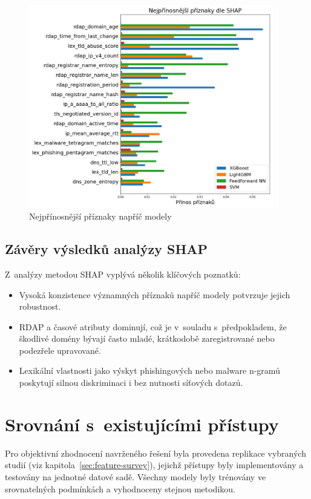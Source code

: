 \begin{figure}[h]
    \centering
    \includegraphics[width=0.95\textwidth]{obrazky-figures/top_10_shap.png}
    \caption{Nejpřínosnější příznaky napříč modely}
    \label{fig:top10shap}
\end{figure}

\subsection*{Závěry výsledků analýzy SHAP}

Z~analýzy metodou SHAP vyplývá několik klíčových poznatků:
\begin{itemize}
    \item Vysoká konzistence významných příznaků napříč modely potvrzuje jejich robustnost.
    \item RDAP a časové atributy dominují, což je v~souladu s~předpokladem, že škodlivé domény bývají často mladé, krátkodobě zaregistrované nebo podezřele upravované.
    \item Lexikální vlastnosti jako výskyt phishingových nebo malware n-gramů poskytují silnou diskriminaci i bez nutnosti síťových dotazů.
\end{itemize}

\section{Srovnání s~existujícími přístupy}
\label{sec:discussion-comparison}

Pro objektivní zhodnocení navrženého řešení byla provedena replikace vybraných studií (viz kapitola~\ref{sec:feature-survey}), jejichž přístupy byly implementovány a testovány na jednotné datové sadě. Všechny modely byly trénovány ve srovnatelných podmínkách a vyhodnoceny stejnou metodikou.

